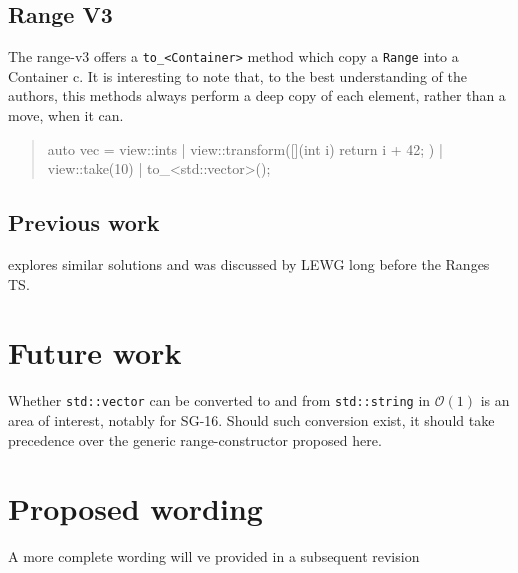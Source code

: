 \documentclass{wg21}
\newcommand{\cc}[1]{\texttt{#1}}
\begin{document}
\subsection{Range V3}

The range-v3 offers a  \cc{to_<Container>} method which copy a \cc{Range} into a Container c.
It is interesting to note that, to the best understanding of the authors, this methods always
perform a deep copy of each element, rather than a move, when it can.

\begin{quote}
\begin{codeblock}
auto vec = view::ints
	| view::transform([](int i) {
		return i + 42;
	})
	| view::take(10)
	| to_<std::vector>();
\end{codeblock}
\end{quote}

\subsection{Previous work}

\cite{N3686} explores similar solutions and was discussed by LEWG long before the Ranges TS.

\section{Future work}

Whether \cc{std::vector} can be converted to and from \cc{std::string} in $\mathcal{O}(1)$ is an area of interest, notably for SG-16.
Should such conversion exist, it should take precedence over the generic range-constructor proposed here.

\section{Proposed wording}

A more complete wording will ve provided in a subsequent revision
\end{document}
